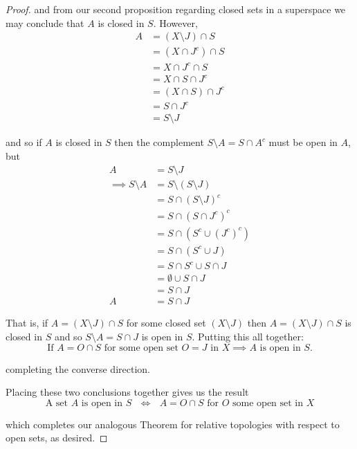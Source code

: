 \documentclass[12pt]{article}
\begin{document}
\begin{proof}
and from our second proposition regarding closed sets in a superspace we may conclude that $A$ is closed in $S$. However,
\begin{align*}
	A &= \left( X \setminus J \right) \cap S \\
	&= \left( X \cap J^c \right) \cap S \\
	&= X \cap J^c \cap S \\	
	&= X \cap S \cap J^c \\
	&= \left( X \cap S \right) \cap J^c \\
	&= S \cap J^c \\
	&= S \setminus J 
\end{align*}

and so if $A$ is closed in $S$ then the complement $S\setminus A = S \cap A^c$ must be open in $A$, but
\begin{align*}
	A &= S \setminus J \\
	\implies S \setminus A &= S \setminus \left( S \setminus J \right) \\
	&= S \cap \left( S \setminus J \right)^c \\
	&= S \cap \left( S \cap J^c \right)^c \\	
	&= S \cap \left( S^c \cup \left(J^c\right)^c \right) \\	
	&= S \cap \left( S^c \cup J \right) \\		
	&= S \cap S^c \cup S \cap J \\
	&= \emptyset \cup S \cap J \\
	&= S \cap J \\
	A &= S \cap J
\end{align*}

That is, if $A = \left( X \setminus J \right) \cap S$ for some closed set $\left( X \setminus J \right)$ then $A = \left( X \setminus J \right) \cap S$ is closed in $S$ and so $S \setminus A = S \cap J$ is open in $S$. Putting this all together:
\begin{equation*}
	\text{If $A = O \cap S$ for some open set $O = J$ in $X \implies A$ is open in $S$.}
\end{equation*}

completing the converse direction. 

Placing these two conclusions together gives us the result
\begin{equation*}
	\text{A set $A$ is open in $S$ $\iff$ $A = O \cap S$ for $O$ some open set in $X$}
\end{equation*}

which completes our analogous Theorem for relative topologies with respect to open sets, as desired.
\end{proof} \hfill
\end{document}
